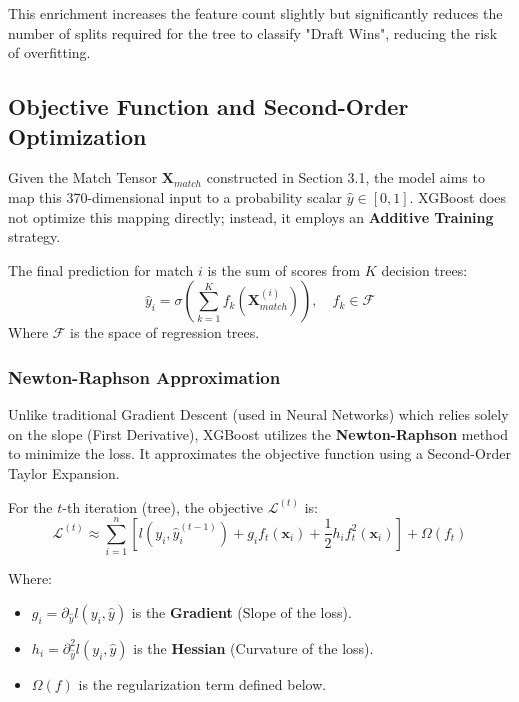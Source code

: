 \documentclass[12pt, a4paper]{article}
\begin{document}
    This enrichment increases the feature count slightly but significantly reduces the number of splits required for the tree to classify "Draft Wins", reducing the risk of overfitting.

    \subsection{Objective Function and Second-Order Optimization}

    Given the Match Tensor $\mathbf{X}_{match}$ constructed in Section 3.1, the model aims to map this 370-dimensional input to a probability scalar $\hat{y} \in [0,1]$. XGBoost does not optimize this mapping directly; instead, it employs an \textbf{Additive Training} strategy.

    The final prediction for match $i$ is the sum of scores from $K$ decision trees:
    \begin{equation}
        \hat{y}_i = \sigma \left( \sum_{k=1}^K f_k(\mathbf{X}_{match}^{(i)}) \right), \quad f_k \in \mathcal{F}
    \end{equation}
    Where $\mathcal{F}$ is the space of regression trees.

    \subsubsection{Newton-Raphson Approximation}
    Unlike traditional Gradient Descent (used in Neural Networks) which relies solely on the slope (First Derivative), XGBoost utilizes the \textbf{Newton-Raphson} method to minimize the loss. It approximates the objective function using a Second-Order Taylor Expansion.

    For the $t$-th iteration (tree), the objective $\mathcal{L}^{(t)}$ is:
    \begin{equation}
        \mathcal{L}^{(t)} \approx \sum_{i=1}^n \left[ l(y_i, \hat{y}_i^{(t-1)}) + g_i f_t(\mathbf{x}_i) + \frac{1}{2}h_i f_t^2(\mathbf{x}_i) \right] + \Omega(f_t)
    \end{equation}

    Where:
    \begin{itemize}
        \item $g_i = \partial_{\hat{y}} l(y_i, \hat{y})$ is the \textbf{Gradient} (Slope of the loss).
        \item $h_i = \partial^2_{\hat{y}} l(y_i, \hat{y})$ is the \textbf{Hessian} (Curvature of the loss).
        \item $\Omega(f)$ is the regularization term defined below.
    \end{itemize}
\end{document}
